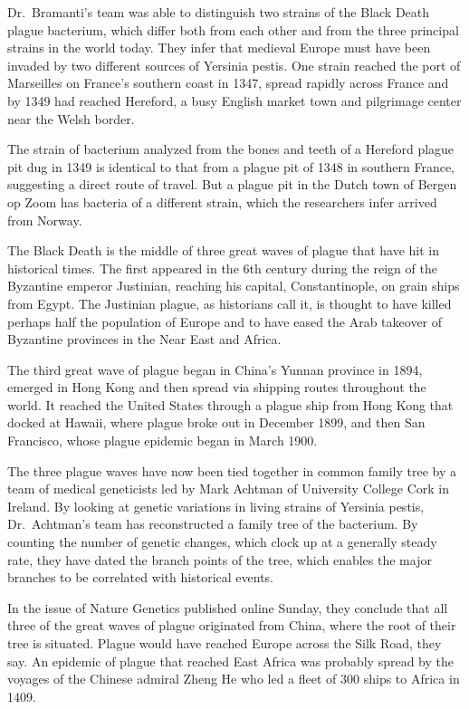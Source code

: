 ﻿\documentclass[12pt]{article}
\begin{document}
Dr.~Bramanti's team was able to distinguish two strains of the Black Death plague bacterium, which
differ both from each other and from the three principal strains in the world today. They infer that
medieval Europe must have been invaded by two different sources of Yersinia pestis. One strain
reached the port of Marseilles on France's southern coast in 1347, spread rapidly across France and
by 1349 had reached Hereford, a busy English market town and pilgrimage center near the Welsh
border.

The strain of bacterium analyzed from the bones and teeth of a Hereford plague pit dug in 1349 is
identical to that from a plague pit of 1348 in southern France, suggesting a direct route of travel.
But a plague pit in the Dutch town of Bergen op Zoom has bacteria of a different strain, which the
researchers infer arrived from Norway.

The Black Death is the middle of three great waves of plague that have hit in historical times. The
first appeared in the 6th century during the reign of the Byzantine emperor Justinian, reaching his
capital, Constantinople, on grain ships from Egypt. The Justinian plague, as historians call it, is
thought to have killed perhaps half the population of Europe and to have eased the Arab takeover of
Byzantine provinces in the Near East and Africa.

The third great wave of plague began in China's Yunnan province in 1894, emerged in Hong Kong and
then spread via shipping routes throughout the world. It reached the United States through a plague
ship from Hong Kong that docked at Hawaii, where plague broke out in December 1899, and then San
Francisco, whose plague epidemic began in March 1900.

The three plague waves have now been tied together in common family tree by a team of medical
geneticists led by Mark Achtman of University College Cork in Ireland. By looking at genetic
variations in living strains of Yersinia pestis, Dr.~Achtman's team has reconstructed a family tree
of the bacterium. By counting the number of genetic changes, which clock up at a generally steady
rate, they have dated the branch points of the tree, which enables the major branches to be
correlated with historical events.

In the issue of Nature Genetics published online Sunday, they conclude that all three of the great
waves of plague originated from China, where the root of their tree is situated. Plague would have
reached Europe across the Silk Road, they say. An epidemic of plague that reached East Africa was
probably spread by the voyages of the Chinese admiral Zheng He who led a fleet of 300 ships to
Africa in 1409.
\end{document}

